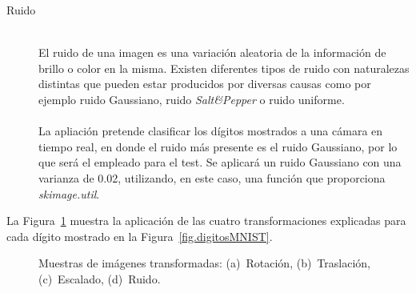 \begin{description}
	\vspace{10pt}
	\item[Ruido] \hfill 
	\vspace{10pt}
	\\
	El ruido de una imagen es una variación aleatoria de la información de brillo o color en la misma. Existen diferentes tipos de ruido con naturalezas distintas que pueden estar producidos por diversas causas como por ejemplo ruido Gaussiano, ruido \textit{Salt\&Pepper} o ruido uniforme.\\
	\vspace{-10pt}
	\\
	La apliación pretende clasificar los dígitos mostrados a una cámara en tiempo real, en donde el ruido más presente es el ruido Gaussiano, por lo que será el empleado para el test. Se aplicará un ruido Gaussiano con  una varianza de 0.02, utilizando, en este caso, una función que proporciona \textit{skimage.util}. 
\end{description}

La Figura~\ref{fig.transformaciones} muestra la aplicación de las cuatro transformaciones explicadas para cada dígito mostrado en la Figura~\ref{fig.digitosMNIST}.

\begin{figure}[H]
	\centering
	 \hspace{10pt}
	 \hspace{10pt}
	 \hspace{10pt}
	\caption{Muestras de imágenes transformadas: (a)~Rotación, (b)~Traslación, (c)~Escalado, (d)~Ruido.}
	\label{fig.transformaciones}
\end{figure}

